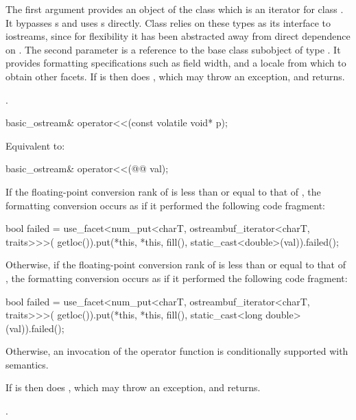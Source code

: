 \begin{itemdescr}
\pnum
The first argument provides an object of the
class which is an iterator for class .
It bypasses
s
and uses
s
directly.
Class
relies on these types as its
interface to iostreams, since for flexibility it has been abstracted
away from direct dependence on
.
The second parameter is a reference to the base class subobject of type
.
It provides formatting specifications such as field width, and
a locale from which to obtain other facets.
If
is
then does
,
which may throw an exception, and returns.

\pnum
\returns
{}.
\end{itemdescr}

%
\begin{itemdecl}
basic_ostream& operator<<(const volatile void* p);
\end{itemdecl}

\begin{itemdescr}
\pnum
\effects
Equivalent to: 
\end{itemdescr}

\begin{itemdecl}
basic_ostream& operator<<(@@ val);
\end{itemdecl}

\begin{itemdescr}
\pnum
\effects
If the floating-point conversion rank of 
is less than or equal to that of ,
the formatting conversion occurs as if it performed the following code fragment:
\begin{codeblock}
bool failed = use_facet<num_put<charT, ostreambuf_iterator<charT, traits>>>(
  getloc()).put(*this, *this, fill(), static_cast<double>(val)).failed();
\end{codeblock}
Otherwise,
if the floating-point conversion rank of 
is less than or equal to that of ,
the formatting conversion occurs as if it performed the following code fragment:
\begin{codeblock}
bool failed = use_facet<num_put<charT, ostreambuf_iterator<charT, traits>>>(
  getloc()).put(*this, *this, fill(), static_cast<long double>(val)).failed();
\end{codeblock}
Otherwise, an invocation of the operator function is conditionally supported
with 
semantics.

If  is  then does ,
which may throw an exception, and returns.

\pnum
\returns
{}.
\end{itemdescr}

